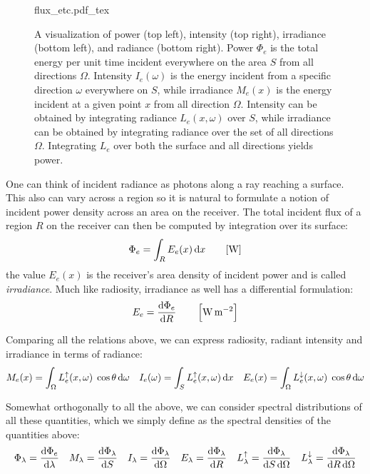 \begin{figure}[tb]
    \centering
    \def\svgwidth{\linewidth}
    {flux_etc.pdf_tex}
    \caption{\label{fig:flux_etc}%
    A visualization of power (top left), intensity (top right), irradiance (bottom left), and radiance (bottom right).
    Power $\Phi_e$ is the total energy per unit time incident everywhere on the area $S$ from all directions $\Omega$. 
    Intensity $I_e(\omega)$ is the energy incident from a specific direction $\omega$ everywhere on $S$, while irradiance $M_e(x)$ is the energy incident at a given point $x$ from all direction $\Omega$.
    Intensity can be obtained by integrating radiance $L_e(x,\omega)$ over $S$, while irradiance can be obtained by integrating radiance over the set of
    all directions $\Omega$. Integrating $L_e$ over both the surface and all directions yields power. }
\end{figure}

One can think of incident radiance as photons along a ray reaching a surface.
This also can vary across a region so it is natural to formulate a notion
of incident power density across an area on the receiver.
The total incident flux of a region $R$ on the receiver can then be computed by
integration over its surface:
\begin{displaymath}
\Phi_e = \int_{R} E_e(x) \d x \qquad [\unit{\watt}]
\end{displaymath}
the value $E_e(x)$ is the receiver's area density of incident power and
is called \textit{irradiance}.
Much like radiosity, irradiance as well has a differential formulation:
\begin{displaymath}
E_e = \frac{\d\Phi_e}{\d R} \qquad \left[\unit{\watt\per\square\meter}\right]
\end{displaymath}

Comparing all the relations above, we can express radiosity, radiant intensity
and irradiance in terms of radiance:
\begin{displaymath}
M_e(x) = \int_\Omega L_e^\uparrow(x,\omega) \;\cos\theta \mathop{}\!\mathrm{d}\omega \quad
I_e(\omega) = \int_S L_e^\uparrow(x,\omega) \mathop{}\!\mathrm{d} x \quad
E_e(x) = \int_\Omega L_e^\downarrow(x,\omega) \;\cos\theta \mathop{}\!\mathrm{d}\omega
\end{displaymath}

Somewhat orthogonally to all the above, we can consider spectral distributions
of all these quantities, which we simply define as the spectral densities of the
quantities above:
\begin{displaymath}
\Phi_{\lambda} = \frac{\d\Phi_e}{\d\lambda} \quad
M_{\lambda} = \frac{\d\Phi_{\lambda}}{\d S} \quad
I_{\lambda} = \frac{\d\Phi_{\lambda}}{\d\Omega} \quad
E_{\lambda} = \frac{\d\Phi_{\lambda}}{\d R} \quad
L_{\lambda}^\uparrow = \frac{\d\Phi_{\lambda}}{\d S \d\Omega} \quad
L_{\lambda}^\downarrow = \frac{\d\Phi_{\lambda}}{\d R \d\Omega}
\end{displaymath}



